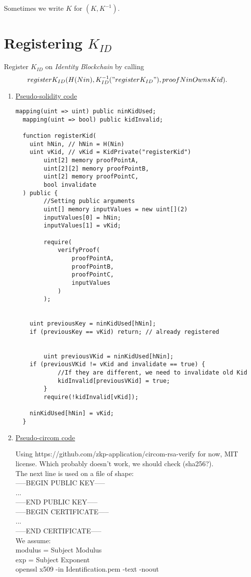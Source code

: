 \documentclass{article}
\newcommand{\kid}{K_{ID}}
\newcommand{\pbc}{\textit{Identity Blockchain}}
\begin{document}
Sometimes we write $K$ for $(K, K^{-1})$.

\newpage
\section{Registering $\kid$}
Register $\kid$ on \pbc{} by calling $$register\kid(H(Nin), \kid^{-1}("register\kid"), proofNinOwnsKid).$$
\begin{enumerate}[leftmargin=0cm]
\item[] \underline{Pseudo-solidity code}

\hfill\begin{minipage}{\dimexpr\textwidth-20px}
\begin{lstlisting}[language=Solidity]
  mapping(uint => uint) public ninKidUsed;
  mapping(uint => bool) public kidInvalid;

  function registerKid(
    uint hNin, // hNin = H(Nin)
    uint vKid, // vKid = KidPrivate("registerKid")
		uint[2] memory proofPointA,
		uint[2][2] memory proofPointB,
		uint[2] memory proofPointC,
		bool invalidate
  ) public {
		//Setting public arguments
		uint[] memory inputValues = new uint[](2)
		inputValues[0] = hNin;
		inputValues[1] = vKid;

		require(
			verifyProof(
				proofPointA,
				proofPointB,
				proofPointC,
				inputValues
			)
		);


    uint previousKey = ninKidUsed[hNin];
    if (previousKey == vKid) return; // already registered


 		uint previousVKid = ninKidUsed[hNin];
    if (previousVKid != vKid and invalidate == true) {
			//If they are different, we need to invalidate old Kid
			kidInvalid[previousVKid] = true;
		}
		require(!kidInvalid[vKid]);

    ninKidUsed[hNin] = vKid;
  }
\end{lstlisting}
\xdef\tpd{\the\prevdepth}
\end{minipage}

\item[] \underline{Pseudo-circom code}

Using https://github.com/zkp-application/circom-rsa-verify for now, MIT license.
Which probably doesn't work, we should check (sha256?). \\
The next line is used on a file of shape:\\
-----BEGIN PUBLIC KEY-----\\
...\\
-----END PUBLIC KEY-----\\
-----BEGIN CERTIFICATE-----\\
...\\
-----END CERTIFICATE-----\\
We assume: \\
	modulus = Subject Modulus\\
	exp = Subject Exponent\\
openssl x509 -in Identification.pem -text -noout\\


\end{enumerate}
\end{document}

